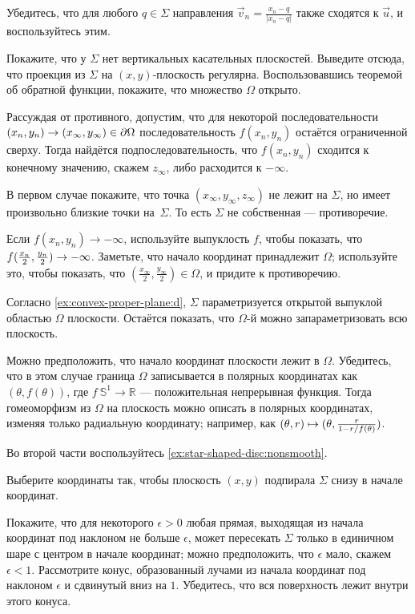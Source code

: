 \begin{multicols}{2}
Убедитесь, что для любого $q\in \Sigma$ направления $\vec v_n=\tfrac{x_n-q}{|x_n-q|}$ также сходятся к $\vec u$, и воспользуйтесь этим.

Покажите, что у $\Sigma$ нет вертикальных касательных плоскостей.
Выведите отсюда, что проекция из $\Sigma$ на $(x,y)$-плоскость регулярна.
Воспользовавшись теоремой об обратной функции, покажите, что множество $\Omega$ открыто.

Рассуждая от противного, допустим, что для некоторой последовательности $(x_n,y_n)\z\to(x_\infty,y_\infty)\in \partial\Omega$ последовательность $f(x_n,y_n)$ остаётся ограниченной сверху.
Тогда найдётся подпоследовательность, что $f(x_n,y_n)$ сходится к конечному значению, скажем $z_\infty$, либо расходится к $-\infty$.

В первом случае покажите, что точка $(x_\infty, y_\infty,z_\infty)$ не лежит на $\Sigma$, но имеет произвольно близкие точки на~$\Sigma$.
То есть $\Sigma$ не собственная --- противоречие.

Если $f(x_n,y_n)\to -\infty$, используйте выпуклость $f$, чтобы показать, что $f(\tfrac{x_n}2 ,\tfrac{y_n}2)\z\to -\infty$.
Заметьте, что начало координат принадлежит $\Omega$;
используйте это, чтобы показать, что $(\tfrac{x_\infty}2, \tfrac{y_\infty}2)\in\Omega$,
и придите к противоречию.

Согласно \ref{ex:convex-proper-plane:d}, $\Sigma$ параметризуется открытой выпуклой областью $\Omega$ плоскости.
Остаётся показать, что $\Omega$-й можно запараметризовать всю плоскость.

Можно предположить, что начало координат плоскости лежит в $\Omega$.
Убедитесь, что в этом случае граница $\Omega$ записывается в полярных координатах как $(\theta,f(\theta))$, где $f\:\mathbb{S}^1\to\mathbb{R}$ --- положительная непрерывная функция.
Тогда гомеоморфизм из $\Omega$ на плоскость можно описать в полярных координатах, изменяя только радиальную координату;
например, как 
$(\theta,r)\z\mapsto (\theta,
\tfrac{r}{1-r/f(\theta)})$.

Во второй части воспользуйтесь \ref{ex:star-shaped-disc:nonsmooth}.

Выберите координаты так, чтобы плоскость $(x,y)$ подпирала $\Sigma$ снизу в начале координат. 

Покажите, что для некоторого $\epsilon>0$ любая прямая, выходящая из начала координат под наклоном не больше $\epsilon$, может пересекать $\Sigma$ только в единичном шаре с центром в начале координат;
можно предположить, что $\epsilon$ мало, скажем $\epsilon<1$.
Рассмотрите конус, образованный лучами из начала координат под наклоном $\epsilon$ и сдвинутый вниз на $1$.
Убедитесь, что вся поверхность лежит внутри этого конуса.


\end{multicols}
